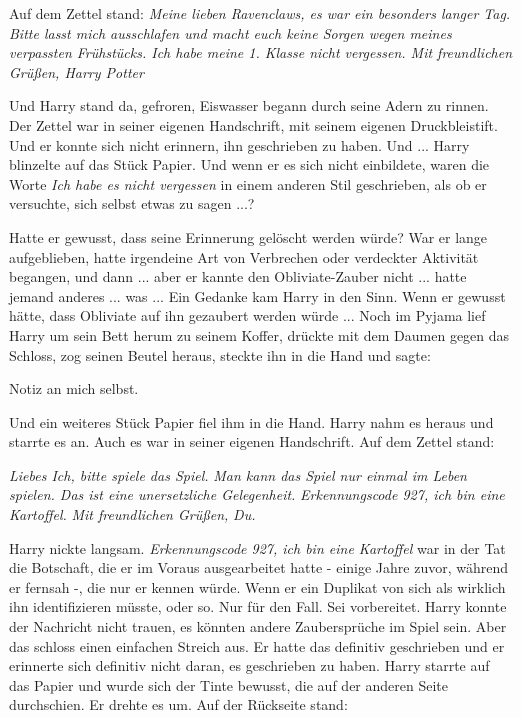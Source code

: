 Auf dem Zettel stand: \glqq{}\emph{Meine lieben Ravenclaws, es war ein besonders
langer Tag. Bitte lasst mich ausschlafen und macht euch keine Sorgen wegen
meines verpassten Frühstücks. Ich habe meine 1. Klasse nicht vergessen. Mit
freundlichen Grüßen, Harry Potter\grqq{}}

Und Harry stand da, gefroren, Eiswasser begann durch seine Adern zu rinnen. Der
Zettel war in seiner eigenen Handschrift, mit seinem eigenen Druckbleistift. Und
er konnte sich nicht erinnern, ihn geschrieben zu haben. Und ... Harry blinzelte
auf das Stück Papier. Und wenn er es sich nicht einbildete, waren die Worte
\emph{\glqq{}Ich habe es nicht vergessen\grqq{}} in einem anderen Stil
geschrieben, als ob er versuchte, sich selbst etwas zu sagen ...?

Hatte er gewusst, dass seine Erinnerung gelöscht werden würde? War er lange
aufgeblieben, hatte irgendeine Art von Verbrechen oder verdeckter Aktivität
begangen, und dann ... aber er kannte den Obliviate-Zauber nicht ... hatte jemand
anderes ... was ... Ein Gedanke kam Harry in den Sinn. Wenn er gewusst hätte, dass
\glqq{}Obliviate\grqq{} auf ihn gezaubert werden würde ... Noch im Pyjama lief
Harry um sein Bett herum zu seinem Koffer, drückte mit dem Daumen gegen das
Schloss, zog seinen Beutel heraus, steckte ihn in die Hand und sagte:

\glqq{}Notiz an mich selbst.\grqq{}

Und ein weiteres Stück Papier fiel ihm in die Hand. Harry nahm es heraus und
starrte es an. Auch es war in seiner eigenen Handschrift. Auf dem Zettel stand:

\emph{Liebes Ich, bitte spiele das Spiel.} \emph{Man kann das Spiel nur einmal
im Leben spielen. Das ist eine unersetzliche Gelegenheit.} \emph{Erkennungscode
927, ich bin eine Kartoffel.} \emph{Mit freundlichen Grüßen,} \emph{Du.}

Harry nickte langsam. \emph{\glqq{}Erkennungscode 927, ich bin eine
Kartoffel\grqq{}} war in der Tat die Botschaft, die er im Voraus ausgearbeitet
hatte - einige Jahre zuvor, während er fernsah -, die nur er kennen würde. Wenn
er ein Duplikat von sich als wirklich ihn identifizieren müsste, oder so. Nur
für den Fall. Sei vorbereitet. Harry konnte der Nachricht nicht trauen, es
könnten andere Zaubersprüche im Spiel sein. Aber das schloss einen einfachen
Streich aus. Er hatte das definitiv geschrieben und er erinnerte sich definitiv
nicht daran, es geschrieben zu haben. Harry starrte auf das Papier und wurde
sich der Tinte bewusst, die auf der anderen Seite durchschien. Er drehte es um.
Auf der Rückseite stand:

